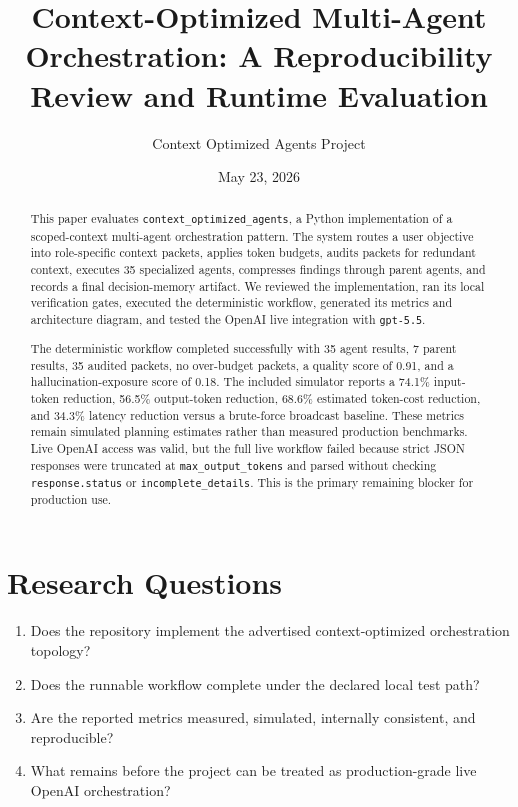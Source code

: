 \documentclass[11pt]{article}
\title{Context-Optimized Multi-Agent Orchestration: A Reproducibility Review and Runtime Evaluation}
\author{Context Optimized Agents Project}
\date{May 23, 2026}
\begin{document}
\maketitle

\begin{abstract}
This paper evaluates \texttt{context\_optimized\_agents}, a Python implementation of a scoped-context multi-agent orchestration pattern. The system routes a user objective into role-specific context packets, applies token budgets, audits packets for redundant context, executes 35 specialized agents, compresses findings through parent agents, and records a final decision-memory artifact. We reviewed the implementation, ran its local verification gates, executed the deterministic workflow, generated its metrics and architecture diagram, and tested the OpenAI live integration with \texttt{gpt-5.5}.

The deterministic workflow completed successfully with 35 agent results, 7 parent results, 35 audited packets, no over-budget packets, a quality score of 0.91, and a hallucination-exposure score of 0.18. The included simulator reports a 74.1\% input-token reduction, 56.5\% output-token reduction, 68.6\% estimated token-cost reduction, and 34.3\% latency reduction versus a brute-force broadcast baseline. These metrics remain simulated planning estimates rather than measured production benchmarks. Live OpenAI access was valid, but the full live workflow failed because strict JSON responses were truncated at \texttt{max\_output\_tokens} and parsed without checking \texttt{response.status} or \texttt{incomplete\_details}. This is the primary remaining blocker for production use.
\end{abstract}

\section{Research Questions}

\begin{enumerate}
  \item Does the repository implement the advertised context-optimized orchestration topology?
  \item Does the runnable workflow complete under the declared local test path?
  \item Are the reported metrics measured, simulated, internally consistent, and reproducible?
  \item What remains before the project can be treated as production-grade live OpenAI orchestration?
\end{enumerate}
\end{document}
